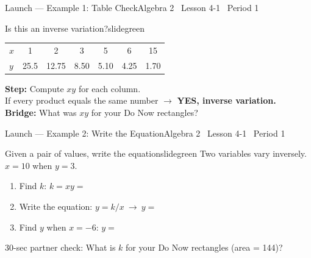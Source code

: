 \documentclass[aspectratio=169, 14pt]{beamer}
\begin{document}
\begin{frame}{Launch --- Example 1: Table Check}{Algebra 2 \textperiodcentered\ Lesson 4-1 \textperiodcentered\ Period 1}
\vspace{0.2cm}
\begin{projcard}{Is this an inverse variation?}{slidegreen}
\begin{tabular}{l|cccccc}
\(x\) & 1 & 2 & 3 & 5 & 6 & 15 \\
\(y\) & 25.5 & 12.75 & 8.50 & 5.10 & 4.25 & 1.70 \\
\end{tabular}

\vspace{0.3cm}
\textbf{Step:} Compute \(xy\) for each column.\\
If every product equals the same number \(\rightarrow\) \textbf{YES, inverse variation.}\\[0.15cm]
\textbf{Bridge:} What was \(xy\) for your Do Now rectangles?
\end{projcard}
\end{frame}

\begin{frame}{Launch --- Example 2: Write the Equation}{Algebra 2 \textperiodcentered\ Lesson 4-1 \textperiodcentered\ Period 1}
\vspace{0.1cm}
\begin{projcard}{Given a pair of values, write the equation}{slidegreen}
\small Two variables vary inversely. \(x = 10\) when \(y = 3\).

\vspace{0.15cm}
\begin{enumerate}
  \setlength{\itemsep}{1pt}
  \item Find \(k\): \(k = xy = \) \underline{\hspace{2cm}}
  \item Write the equation: \(y = k/x\ \longrightarrow\ y = \) \underline{\hspace{2cm}}
  \item Find \(y\) when \(x = -6\): \(y = \) \underline{\hspace{2cm}}
\end{enumerate}
\vspace{0.1cm}
\small\textcolor{slidegray}{30-sec partner check: What is \(k\) for your Do Now rectangles (area = 144)?}
\end{projcard}
\end{frame}
\end{document}
